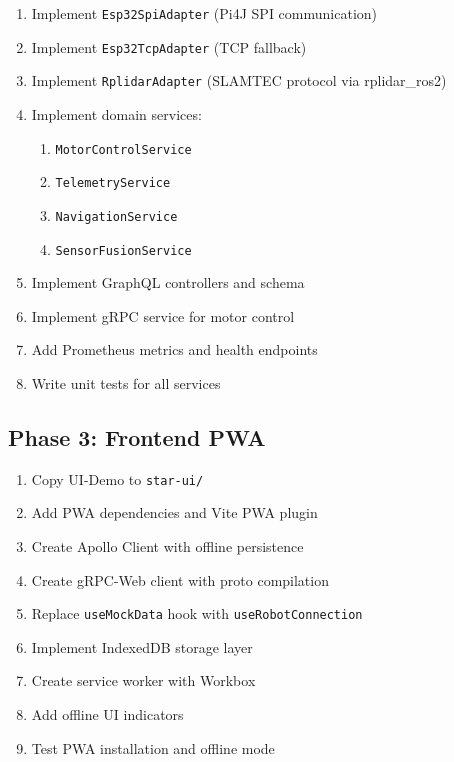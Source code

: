 \documentclass[11pt,letterpaper]{article}
\begin{document}
\begin{enumerate}
    \item[$\square$] Implement \texttt{Esp32SpiAdapter} (Pi4J SPI communication)
    \item[$\square$] Implement \texttt{Esp32TcpAdapter} (TCP fallback)
    \item[$\square$] Implement \texttt{RplidarAdapter} (SLAMTEC protocol via rplidar\_ros2)
    \item[$\square$] Implement domain services:
    \begin{enumerate}
        \item[$\square$] \texttt{MotorControlService}
        \item[$\square$] \texttt{TelemetryService}
        \item[$\square$] \texttt{NavigationService}
        \item[$\square$] \texttt{SensorFusionService}
    \end{enumerate}
    \item[$\square$] Implement GraphQL controllers and schema
    \item[$\square$] Implement gRPC service for motor control
    \item[$\square$] Add Prometheus metrics and health endpoints
    \item[$\square$] Write unit tests for all services
\end{enumerate}

\subsection{Phase 3: Frontend PWA}

\begin{enumerate}
    \item[$\square$] Copy UI-Demo to \texttt{star-ui/}
    \item[$\square$] Add PWA dependencies and Vite PWA plugin
    \item[$\square$] Create Apollo Client with offline persistence
    \item[$\square$] Create gRPC-Web client with proto compilation
    \item[$\square$] Replace \texttt{useMockData} hook with \texttt{useRobotConnection}
    \item[$\square$] Implement IndexedDB storage layer
    \item[$\square$] Create service worker with Workbox
    \item[$\square$] Add offline UI indicators
    \item[$\square$] Test PWA installation and offline mode
\end{enumerate}
\end{document}
